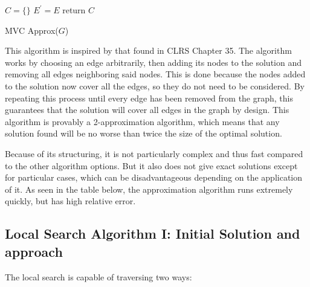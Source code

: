 \begin{algorithm}[ht]
\SetAlgoNoLine
$C = \{ \}$\;
$E^{\prime}= E$\;
return $C$\;
\caption{MVC Approx($G$)}
\label{alg:one}
\end{algorithm}

This algorithm is inspired by that found in CLRS Chapter 35. The algorithm works by choosing an edge arbitrarily, then adding its nodes to the solution and removing all edges neighboring said nodes. This is done because the nodes added to the solution now cover all the edges, so they do not need to be considered. By repeating this process until every edge has been removed from the graph, this guarantees that the solution will cover all edges in the graph by design. This algorithm is provably a 2-approximation algorithm, which means that any solution found will be no worse than twice the size of the optimal solution. 

Because of its structuring, it is not particularly complex and thus fast compared to the other algorithm options. But it also does not give exact solutions except for particular cases, which can be disadvantageous depending on the application of it. As seen in the table below, the approximation algorithm runs extremely quickly, but has high relative error. 

\subsection{Local Search Algorithm I: Initial Solution and approach}
The local search is capable of traversing two ways:


